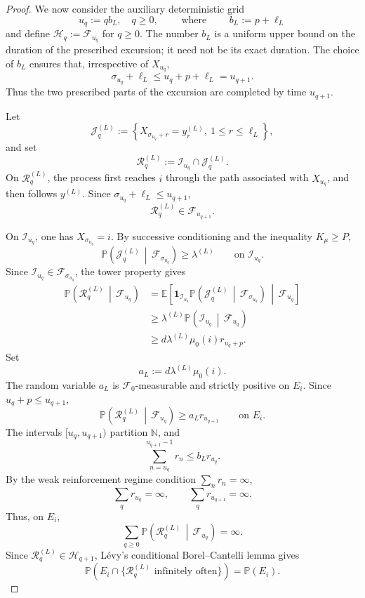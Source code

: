 \documentclass[10pt,a4paper]{amsart}
\begin{document}
\begin{proof}
We now consider the auxiliary deterministic grid
\[
u_q:=qb_L,
\quad q\geq0, \qquad \text{ where } \qquad b_L:=p+\ell_L
\]
and define \(\mathcal H_q:=\mathcal F_{u_q}\) for \(q\geq0\). The number \(b_L\) is a uniform upper bound on the duration of the prescribed
excursion; it need not be its exact duration.
The choice of \(b_L\) ensures that, irrespective of \(X_{u_q}\),
\[
\sigma_{u_q}+\ell_L
\leq
u_q+p+\ell_L
=
u_{q+1}.
\]
Thus the two prescribed parts of the excursion are completed by time
\(u_{q+1}\).



Let
\[
\mathcal J_q^{(L)}
:=
\left\{
X_{\sigma_{u_q}+r}=y_r^{(L)},
\ 1\leq r\leq\ell_L
\right\},
\]
and set
\[
\mathcal R_q^{(L)}
:=
\mathcal I_{u_q}\cap\mathcal J_q^{(L)}.
\]
On \(\mathcal R_q^{(L)}\), the process first reaches \(i\) through the path
associated with \(X_{u_q}\), and then follows \(y^{(L)}\). Since
\(\sigma_{u_q}+\ell_L\leq u_{q+1}\),
\[
\mathcal R_q^{(L)}\in\mathcal F_{u_{q+1}}.
\]



On \(\mathcal I_{u_q}\), one has \(X_{\sigma_{u_q}}=i\). By successive
conditioning and the inequality \(K_\mu\geq P\),
\[
\mathbb P\left(
\mathcal J_q^{(L)}
\,\middle|\,
\mathcal F_{\sigma_{u_q}}
\right)
\geq
\lambda^{(L)}
\qquad\text{on }\mathcal I_{u_q}.
\]
Since \(\mathcal I_{u_q}\in\mathcal F_{\sigma_{u_q}}\), the tower property
gives
\[
\begin{aligned}
\mathbb P\left(
\mathcal R_q^{(L)}
\,\middle|\,
\mathcal F_{u_q}
\right)
&=
\mathbb E\left[
\mathbf1_{\mathcal I_{u_q}}
\mathbb P\left(
\mathcal J_q^{(L)}
\,\middle|\,
\mathcal F_{\sigma_{u_q}}
\right)
\,\middle|\,
\mathcal F_{u_q}
\right]\\
&\geq
\lambda^{(L)}
\mathbb P\left(
\mathcal I_{u_q}
\,\middle|\,
\mathcal F_{u_q}
\right)\\
&\geq
d\lambda^{(L)}\mu_0(i)r_{u_q+p}.
\end{aligned}
\]
Set
\[
a_L:=d\lambda^{(L)}\mu_0(i).
\]
The random variable \(a_L\) is \(\mathcal F_0\)-measurable and strictly
positive on \(E_i\).
Since \(u_q+p\leq u_{q+1}\),
\[
\mathbb P\left(
\mathcal R_q^{(L)}
\,\middle|\,
\mathcal F_{u_q}
\right)
\geq
a_Lr_{u_{q+1}}
\qquad\text{on }E_i.
\]
The intervals \([u_q,u_{q+1})\) partition \(\mathbb N\), and
\[
\sum_{n=u_q}^{u_{q+1}-1}r_n
\leq
b_Lr_{u_q}.
\]
By the weak reinforcement regime condition \(\sum_n r_n=\infty\),
\[
\sum_qr_{u_q}=\infty,
\qquad
\sum_qr_{u_{q+1}}=\infty.
\]
Thus, on \(E_i\),
\[
\sum_{q\geq0}
\mathbb P\left(
\mathcal R_q^{(L)}
\,\middle|\,
\mathcal F_{u_q}
\right)
=
\infty.
\]
Since
\(\mathcal R_q^{(L)}\in\mathcal H_{q+1}\),
Lévy's conditional Borel--Cantelli lemma gives
\[
\mathbb P\left(
E_i\cap
\{\mathcal R_q^{(L)}\text{ infinitely often}\}
\right)
=
\mathbb P(E_i).
\]



\end{proof}
\end{document}

